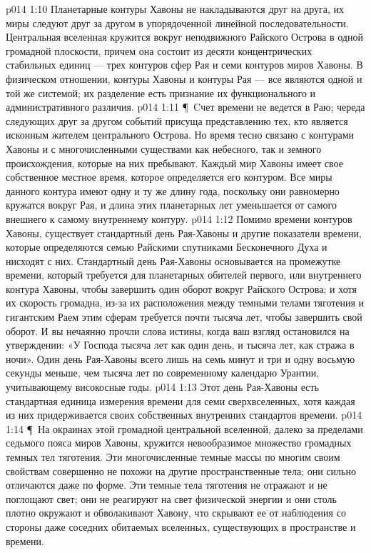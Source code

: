 \vs p014 1:10 Планетарные контуры Хавоны не накладываются друг на друга, их миры следуют друг за другом в упорядоченной линейной последовательности. Центральная вселенная кружится вокруг неподвижного Райского Острова в одной громадной плоскости, причем она состоит из десяти концентрических стабильных единиц --- трех контуров сфер Рая и семи контуров миров Хавоны. В физическом отношении, контуры Хавоны и контуры Рая --- все являются одной и той же системой; их разделение есть признание их функционального и административного различия.
\vs p014 1:11 \P\ Cчет времени не ведется в Раю; череда следующих друг за другом событий присуща представлению тех, кто является исконным жителем центрального Острова. Но время тесно связано с контурами Хавоны и с многочисленными существами как небесного, так и земного происхождения, которые на них пребывают. Каждый мир Хавоны имеет свое собственное местное время, которое определяется его контуром. Все миры данного контура имеют одну и ту же длину года, поскольку они равномерно кружатся вокруг Рая, и длина этих планетарных лет уменьшается от самого внешнего к самому внутреннему контуру.
\vs p014 1:12 Помимо времени контуров Хавоны, существует стандартный день Рая\hyp{}Хавоны и другие показатели времени, которые определяются семью Райскими спутниками Бесконечного Духа и нисходят с них. Стандартный день Рая\hyp{}Хавоны основывается на промежутке времени, который требуется для планетарных обителей первого, или внутреннего контура Хавоны, чтобы завершить один оборот вокруг Райского Острова; и хотя их скорость громадна, из\hyp{}за их расположения между темными телами тяготения и гигантским Раем этим сферам требуется почти тысяча лет, чтобы завершить свой оборот. И вы нечаянно прочли слова истины, когда ваш взгляд остановился на утверждении: «У Господа тысяча лет как один день, и тысяча лет, как стража в ночи». Один день Рая\hyp{}Хавоны всего лишь на семь минут и три и одну восьмую секунды меньше, чем тысяча лет по современному календарю Урантии, учитывающему високосные годы.
\vs p014 1:13 Этот день Рая\hyp{}Хавоны есть стандартная единица измерения времени для семи сверхвселенных, хотя каждая из них придерживается своих собственных внутренних стандартов времени.
\vs p014 1:14 \P\ На окраинах этой громадной центральной вселенной, далеко за пределами седьмого пояса миров Хавоны, кружится невообразимое множество громадных темных тел тяготения. Эти многочисленные темные массы по многим своим свойствам совершенно не похожи на другие пространственные тела; они сильно отличаются даже по форме. Эти темные тела тяготения не отражают и не поглощают свет; они не реагируют на свет физической энергии и они столь плотно окружают и обволакивают Хавону, что скрывают ее от наблюдения со стороны даже соседних обитаемых вселенных, существующих в пространстве и времени.
